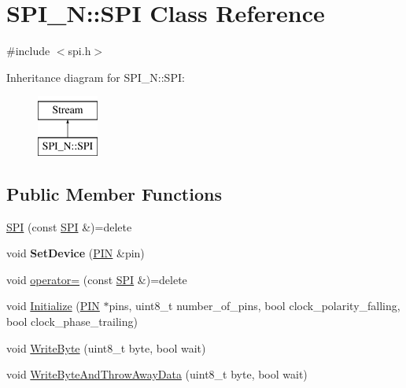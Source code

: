 \hypertarget{class_s_p_i___n_1_1_s_p_i}{}\section{S\+P\+I\+\_\+N\+:\+:S\+PI Class Reference}
\label{class_s_p_i___n_1_1_s_p_i}


{\ttfamily \#include $<$spi.\+h$>$}

Inheritance diagram for S\+P\+I\+\_\+N\+:\+:S\+PI\+:\begin{figure}[H]
\begin{center}
\leavevmode
\includegraphics[height=2.000000cm]{class_s_p_i___n_1_1_s_p_i}
\end{center}
\end{figure}
\subsection*{Public Member Functions}
\begin{DoxyCompactItemize}
\item 
\hyperlink{class_s_p_i___n_1_1_s_p_i_ab486ba0f0d9ec880520e568762cc6c7d}{S\+PI} (const \hyperlink{class_s_p_i___n_1_1_s_p_i}{S\+PI} \&)=delete
\item 
\hypertarget{class_s_p_i___n_1_1_s_p_i_ad04a79c8e9139545a96af71245ce8d18}{}\label{class_s_p_i___n_1_1_s_p_i_ad04a79c8e9139545a96af71245ce8d18} 
void {\bfseries Set\+Device} (\hyperlink{struct_s_p_i___n_1_1_p_i_n}{P\+IN} \&pin)
\item 
void \hyperlink{class_s_p_i___n_1_1_s_p_i_aabc66612d396c2b70e5cbdba405dbfe5}{operator=} (const \hyperlink{class_s_p_i___n_1_1_s_p_i}{S\+PI} \&)=delete
\item 
void \hyperlink{class_s_p_i___n_1_1_s_p_i_ab0517cd53e32d224a0171e6eeb200870}{Initialize} (\hyperlink{struct_s_p_i___n_1_1_p_i_n}{P\+IN} $\ast$pins, uint8\+\_\+t number\+\_\+of\+\_\+pins, bool clock\+\_\+polarity\+\_\+falling, bool clock\+\_\+phase\+\_\+trailing)
\item 
void \hyperlink{class_s_p_i___n_1_1_s_p_i_a542dc8e88203de7040ce9926d06b9463}{Write\+Byte} (uint8\+\_\+t byte, bool wait)
\item 
void \hyperlink{class_s_p_i___n_1_1_s_p_i_a05bcca2e033422b2e6ad570320d03fcb}{Write\+Byte\+And\+Throw\+Away\+Data} (uint8\+\_\+t byte, bool wait)
\end{DoxyCompactItemize}
